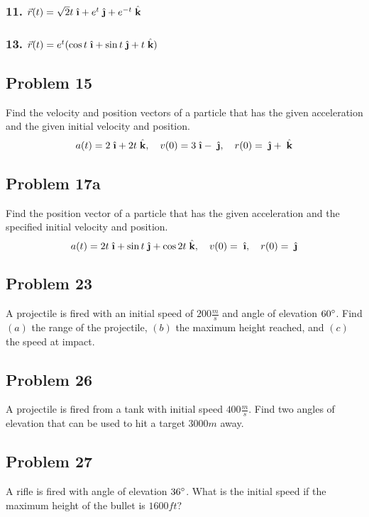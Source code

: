 \documentclass{article}
\newcommand{\ihat}{\;\hat{\textbf{\i}}}
\newcommand{\jhat}{\;\hat{\textbf{\j}}}
\newcommand{\khat}{\;\hat{\textbf{k}}}
\newcommand{\rvec}{\vec{r}(t)}
\begin{document}
\subsubsection*{11. $\rvec = \sqrt 2 t\ihat + e^t\jhat + e^{-t} \khat$}
\subsubsection*{13. $\rvec = e^t(\cos t\ihat + \sin t\jhat + t\khat)$}
\subsection*{Problem 15}

Find the velocity and position vectors of a particle that has the given acceleration and the given initial velocity and position.
\[
    a(t) = 2\ihat + 2t\khat, \quad v(0) = 3\ihat - \jhat, \quad r(0) = \jhat + \khat
\]

\subsection*{Problem 17a}

Find the position vector of a particle that has the given acceleration and the specified initial velocity and position.
\[
    a(t) = 2t\ihat + \sin t\jhat + \cos 2t\khat, \quad v(0) = \ihat, \quad r(0) = \jhat
\]

\subsection*{Problem 23}

A projectile is fired with an initial speed of $200\frac m s$ and angle of elevation $60 \degree$. Find $(a)$ the range of the projectile, $(b)$ the maximum height reached, and $(c)$ the speed at impact.

\subsection*{Problem 26}

A projectile is fired from a tank with initial speed $400 \frac m s$. Find two angles of elevation that can be used to hit a target $3000m$ away.

\subsection*{Problem 27}

A rifle is fired with angle of elevation $36\degree$. What is the initial speed if the maximum height of the bullet is $1600 ft$?
\end{document}
